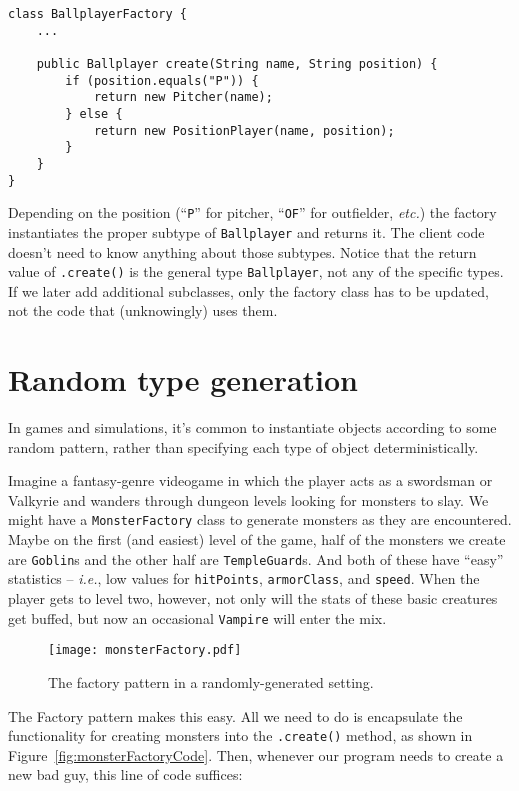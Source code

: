 \begin{Verbatim}[fontsize=\footnotesize,samepage=true,frame=single]
class BallplayerFactory {
    ...

    public Ballplayer create(String name, String position) {
        if (position.equals("P")) {
            return new Pitcher(name);
        } else {
            return new PositionPlayer(name, position);
        }
    }
}
\end{Verbatim}

Depending on the position (``\texttt{P}'' for pitcher, ``\texttt{OF}'' for
outfielder, \textit{etc.}) the factory instantiates the proper subtype of
\texttt{Ballplayer} and returns it. The client code doesn't need to know
anything about those subtypes. Notice that the return value of
\texttt{.create()} is the general type \texttt{Ballplayer}, not any of the
specific types. If we later add additional subclasses, only the factory class
has to be updated, not the code that (unknowingly) uses them.

\section{Random type generation}

In games and simulations, it's common to instantiate objects according to some
random pattern, rather than specifying each type of object deterministically.

Imagine a fantasy-genre videogame in which the player acts as a swordsman or
Valkyrie and wanders through dungeon levels looking for monsters to slay. We
might have a \texttt{MonsterFactory} class to generate monsters as they are
encountered. Maybe on the first (and easiest) level of the game, half of the
monsters we create are \texttt{Goblin}s and the other half are
\texttt{TempleGuard}s. And both of these have ``easy'' statistics --
\textit{i.e.}, low values for \texttt{hitPoints}, \texttt{armorClass}, and
\texttt{speed}. When the player gets to level two, however, not only will the
stats of these basic creatures get buffed, but now an occasional
\texttt{Vampire} will enter the mix.

\begin{figure}
\centering
\texttt{[image: monsterFactory.pdf]}
\caption{The factory pattern in a randomly-generated setting.}
\label{fig:monsterFactory}
\end{figure}

The Factory pattern makes this easy. All we need to do is encapsulate the
functionality for creating monsters into the \texttt{.create()} method, as
shown in Figure~\ref{fig:monsterFactoryCode}. Then, whenever our program needs
to create a new bad guy, this line of code suffices:

